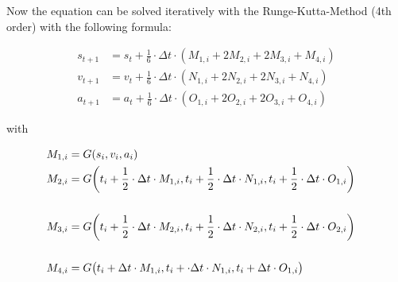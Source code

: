 Now the equation can be solved iteratively with the Runge-Kutta-Method (4th order) with the following formula:

\begin{align}
	s_{t+1} &= s_t + \frac{1}{6} \cdot \Delta t \cdot (M_{1,i} + 2 M_{2,i} +2M_{3,i} +M_{4,i} ) \\ v_{t+1} &= v_t + \frac{1}{6} \cdot \Delta t \cdot (N_{1,i} + 2 N_{2,i} +2N_{3,i} +N_{4,i} ) \\
	a_{t+1} &= a_t + \frac{1}{6} \cdot \Delta t \cdot (O_{1,i} + 2 O_{2,i} +2O_{3,i} +O_{4,i} ) 
\end{align}

with 

\begin{align}
M_{1,i} &= G(s_i, v_i, a_i) \\
M_{2,i} &\begin{multlined}[t]= G \biggl(t_i + \frac{1}{2} \cdot \Delta t \cdot M_{1,i}, t_i + \frac{1}{2} \cdot \Delta t \cdot N_{1,i}, t_i + \insertForSmartphone{\\} \frac{1}{2} \cdot \Delta t \cdot O_{1,i}\biggr) \\\end{multlined} \\
M_{3,i} &\begin{multlined}[t]= G \biggl(t_i + \frac{1}{2} \cdot \Delta t \cdot M_{2,i}, t_i + \frac{1}{2} \cdot \Delta t \cdot N_{2,i}, t_i + \insertForSmartphone{\\} \frac{1}{2} \cdot \Delta t \cdot O_{2,i}\biggr) \\ \end{multlined} \\
M_{4,i} &\begin{multlined}[t]= G \bigl(t_i +  \Delta t \cdot M_{1,i}, t_i + \cdot \Delta t \cdot N_{1,i}, t_i + \insertForSmartphone{\\} \Delta t \cdot O_{1,i}\bigr)\\ \end{multlined}
\end{align}
